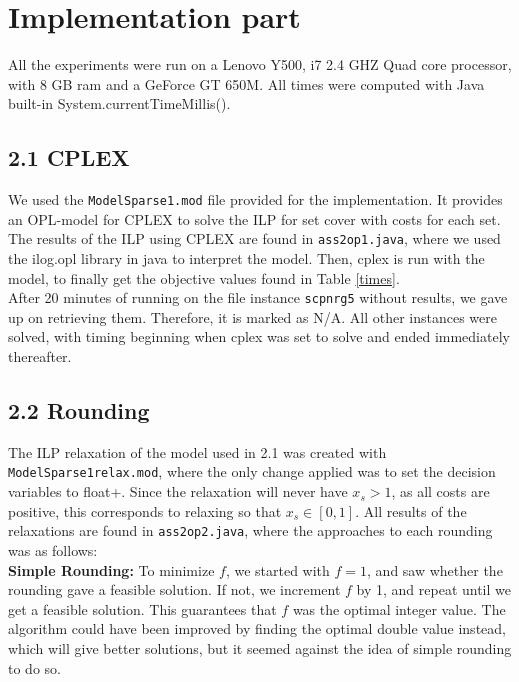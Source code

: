 \documentclass[12pt]{article}
\begin{document}
\pagebreak
\section*{Implementation part}

All the experiments were run on a Lenovo Y500, i7 2.4 GHZ Quad core processor, with 8 GB ram and a GeForce GT 650M. All times were computed with Java built-in System.currentTimeMillis().

\subsection*{2.1 CPLEX}

We used the {\tt ModelSparse1.mod} file provided for the implementation. It provides an OPL-model for CPLEX to solve the ILP for set cover with costs for each set. The results of the ILP using CPLEX are found in {\tt ass2op1.java}, where we used the ilog.opl library in java to interpret the model. Then, cplex is run with the model, to finally get the objective values found in Table \ref{times}.\\

After 20 minutes of running on the file instance {\tt scpnrg5} without results, we gave up on retrieving them. Therefore, it is marked as N/A. All other instances were solved, with timing beginning when cplex was set to solve and ended immediately thereafter.
\subsection*{2.2 Rounding}

The ILP relaxation of the model used in 2.1 was created with {\tt ModelSparse1relax.mod}, where the only change applied was to set the decision variables to float+. Since the relaxation will never have $x_s>1$, as all costs are positive, this corresponds to relaxing so that $x_s \in \left[ 0, 1\right]$. All results of the relaxations are found in {\tt ass2op2.java}, where the approaches to each rounding was as follows:\\

{\bf Simple Rounding:} To minimize $f$, we started with $f=1$, and saw whether the rounding gave a feasible solution. If not, we increment $f$ by 1, and repeat until we get a feasible solution. This guarantees that $f$ was the optimal integer value. The algorithm could have been improved by finding the optimal double value instead, which will give better solutions, but it seemed against the idea of simple rounding to do so.\\
\end{document}
